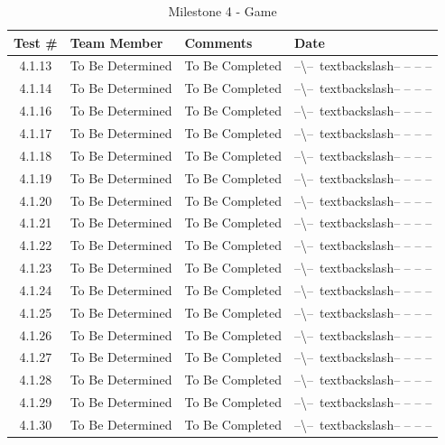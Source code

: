 \documentclass{article}
\begin{document}
\begin{table}[H]
\caption{Milestone 4 - Game}
	\begin{tabularx}{\textwidth}{| c | l | X | l |}
	\toprule
	Test \#& Team Member &Comments &Date\\
	\midrule
	4.1.13 & To Be Determined & To Be Completed & --\textbackslash--\
	textbackslash-- -- -- --\\
	4.1.14 & To Be Determined & To Be Completed & --\textbackslash--\
	textbackslash-- -- -- --\\
	4.1.16 & To Be Determined & To Be Completed & --\textbackslash--\
	textbackslash-- -- -- --\\
	4.1.17 & To Be Determined & To Be Completed & --\textbackslash--\
	textbackslash-- -- -- --\\
	4.1.18 & To Be Determined & To Be Completed & --\textbackslash--\
	textbackslash-- -- -- --\\
	4.1.19 & To Be Determined & To Be Completed & --\textbackslash--\
	textbackslash-- -- -- --\\
	4.1.20 & To Be Determined & To Be Completed & --\textbackslash--\
	textbackslash-- -- -- --\\
	4.1.21 & To Be Determined & To Be Completed & --\textbackslash--\
	textbackslash-- -- -- --\\
	4.1.22 & To Be Determined & To Be Completed & --\textbackslash--\
	textbackslash-- -- -- --\\
	4.1.23 & To Be Determined & To Be Completed & --\textbackslash--\
	textbackslash-- -- -- --\\
	4.1.24 & To Be Determined & To Be Completed & --\textbackslash--\
	textbackslash-- -- -- --\\
	4.1.25 & To Be Determined & To Be Completed & --\textbackslash--\
	textbackslash-- -- -- --\\
	4.1.26 & To Be Determined & To Be Completed & --\textbackslash--\
	textbackslash-- -- -- --\\
	4.1.27 & To Be Determined & To Be Completed & --\textbackslash--\
	textbackslash-- -- -- --\\
	4.1.28 & To Be Determined & To Be Completed & --\textbackslash--\
	textbackslash-- -- -- --\\
	4.1.29 & To Be Determined & To Be Completed & --\textbackslash--\
	textbackslash-- -- -- --\\
	4.1.30 & To Be Determined & To Be Completed & --\textbackslash--\
	textbackslash-- -- -- --\\
	\bottomrule
	\end{tabularx}
\end{table}
\end{document}
